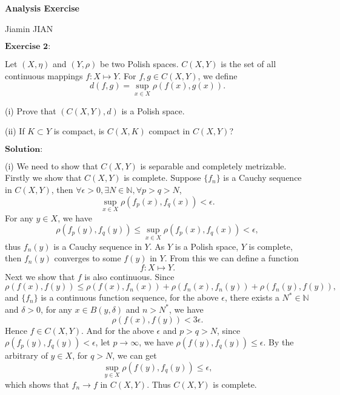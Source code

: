 \documentclass[12pt,a4paper]{ctexart}
\begin{document}
\begin{center}
\textbf{Analysis Exercise}
\vspace{8pt}

Jiamin JIAN
\end{center}

\vspace{12pt}

$\textbf{Exercise 2:}$

Let $(X, \eta)$ and $(Y, \rho)$ be two Polish spaces. $C(X, Y)$ is the set of all continuous mappings $f: X \mapsto Y$. For $f, g \in C(X, Y)$, we define
\begin{equation*}
    d(f, g) = \sup_{x \in X} \rho(f(x), g(x)).
\end{equation*}

(i) Prove that $(C(X, Y), d)$ is a Polish space.

(ii) If $K \subset Y$ is compact, is $C(X, K)$ compact in $C(X, Y)$?

\vspace{8pt}

$\textbf{Solution:}$

(i) We need to show that $C(X, Y)$ is separable and completely metrizable. Firstly we show that $C(X, Y)$ is complete. Suppose $\{f_{n}\}$ is a Cauchy sequence in $C(X, Y)$, then $\forall \epsilon > 0, \exists N \in \mathbb{N}, \forall p > q > N$,
\begin{equation*}
    \sup_{x \in X} \rho(f_{p}(x), f_{q} (x) ) < \epsilon.
\end{equation*}
For any $y \in X$, we have
\begin{equation*}
    \rho(f_{p}(y), f_{q} (y)) \leq \sup_{x \in X} \rho(f_{p}(x), f_{q} (x)) < \epsilon,
\end{equation*}
thus $f_{n}(y)$ is a Cauchy sequence in $Y$. As $Y$ is a Polish space, $Y$ is complete, then $f_{n}(y)$ converges to some $f(y)$ in $Y$. From this we can define a function
\begin{equation*}
    f: X \mapsto Y.
\end{equation*}
Next we show that $f$ is also continuous. Since
\begin{equation*}
    \rho(f(x), f(y)) \leq \rho(f(x), f_{n}(x)) + \rho(f_{n}(x) , f_{n}(y)) + \rho(f_{n}(y), f(y)),
\end{equation*}
and $\{f_{n}\}$ is a continuous function sequence, for the above $\epsilon$, there exists a $N^{*} \in \mathbb{N}$ and $\delta > 0$, for any $x \in B(y, \delta)$ and $n > N^{*}$, we have
\begin{equation*}
    \rho(f(x), f(y)) < 3 \epsilon.
\end{equation*}
Hence $f \in C(X, Y)$. And for the above $\epsilon$ and $p > q > N$, since $\rho(f_{p}(y), f_{q} (y)) < \epsilon$, let $p \to \infty$, we have $\rho(f(y), f_{q}(y)) \leq \epsilon$. By the arbitrary of $y \in X$, for $q > N$, we can get
\begin{equation*}
    \sup_{y \in X} \rho(f(y), f_{q}(y)) \leq \epsilon,
\end{equation*}
which shows that $f_{n} \to f$ in $C(X, Y)$. Thus $C(X, Y)$ is complete.
\end{document}
